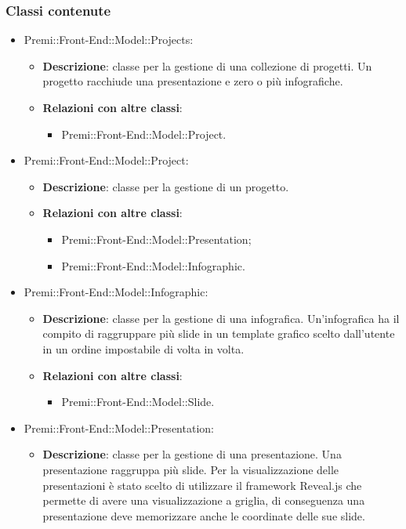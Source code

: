 \subsubsection*{Classi contenute}
\begin{itemize}
	\item Premi::Front-End::Model::Projects:
	\begin{itemize}
		\item \textbf{Descrizione}: classe per la gestione di una collezione di progetti. Un progetto racchiude una presentazione e zero o più infografiche.
		\item \textbf{Relazioni con altre classi}:
		\begin{itemize}
			\item Premi::Front-End::Model::Project.
		\end{itemize}
	\end{itemize}
	\item  Premi::Front-End::Model::Project:
	\begin{itemize}
		\item \textbf{Descrizione}: classe per la gestione di un progetto.
		\item \textbf{Relazioni con altre classi}:
		\begin{itemize}
			\item Premi::Front-End::Model::Presentation;
			\item Premi::Front-End::Model::Infographic.
		\end{itemize}
	\end{itemize}
	\item  Premi::Front-End::Model::Infographic:
	\begin{itemize}
		\item \textbf{Descrizione}: classe per la gestione di una \gls{infografica}. Un'\gls{infografica} ha il compito di raggruppare più \gls{slide} in un \gls{template} grafico scelto dall'utente in un ordine impostabile di volta in volta.
		\item \textbf{Relazioni con altre classi}:
		\begin{itemize}
			\item Premi::Front-End::Model::Slide.
		\end{itemize}
	\end{itemize}
	\item   Premi::Front-End::Model::Presentation:
	\begin{itemize}
		\item \textbf{Descrizione}: classe per la gestione di una presentazione. Una presentazione raggruppa più \gls{slide}. Per la visualizzazione delle presentazioni è stato scelto di utilizzare il \gls{framework} \gls{Reveal.js} che permette di avere una visualizzazione a griglia, di conseguenza una presentazione deve memorizzare anche le coordinate delle sue \gls{slide}.

\end{itemize}
\end{itemize}
